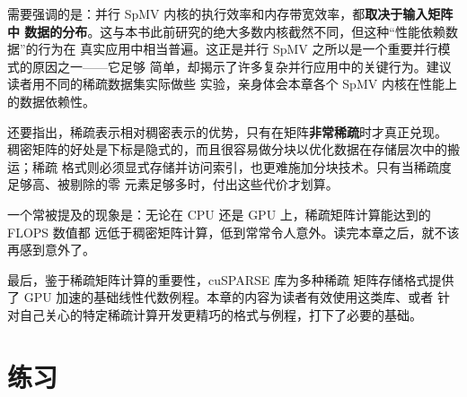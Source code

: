 需要强调的是：并行 SpMV 内核的执行效率和内存带宽效率，都\textbf{取决于输入矩阵中
数据的分布}。这与本书此前研究的绝大多数内核截然不同，但这种“性能依赖数据”的行为在
真实应用中相当普遍。这正是并行 SpMV 之所以是一个重要并行模式的原因之一——它足够
简单，却揭示了许多复杂并行应用中的关键行为。建议读者用不同的稀疏数据集实际做些
实验\cite{bell2009spmv}，亲身体会本章各个 SpMV 内核在性能上的数据依赖性。

还要指出，稀疏表示相对稠密表示的优势，只有在矩阵\textbf{非常稀疏}时才真正兑现。
稠密矩阵的好处是下标是隐式的，而且很容易做分块以优化数据在存储层次中的搬运；稀疏
格式则必须显式存储并访问索引，也更难施加分块技术。只有当稀疏度足够高、被剔除的零
元素足够多时，付出这些代价才划算。

一个常被提及的现象是：无论在 CPU 还是 GPU 上，稀疏矩阵计算能达到的 FLOPS 数值都
远低于稠密矩阵计算，低到常常令人意外。读完本章之后，就不该再感到意外了。

最后，鉴于稀疏矩阵计算的重要性，cuSPARSE 库\cite{nvidia-cusparse2025}为多种稀疏
矩阵存储格式提供了 GPU 加速的基础线性代数例程。本章的内容为读者有效使用这类库、或者
针对自己关心的特定稀疏计算开发更精巧的格式与例程，打下了必要的基础。

\section*{练习}


